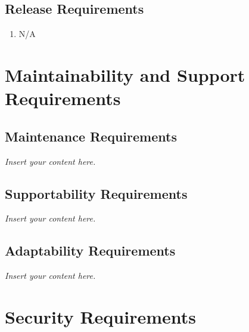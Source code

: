 \documentclass[12pt]{article}
\newcommand{\lips}{\textit{Insert your content here.}}
\begin{document}
\subsection{Release Requirements}
\begin{enumerate}[{OE-R}1. ]
  \item N/A
\end{enumerate}

\section{Maintainability and Support Requirements}
\subsection{Maintenance Requirements}
\lips
\subsection{Supportability Requirements}
\lips
\subsection{Adaptability Requirements}
\lips

\section{Security Requirements}
\end{document}
